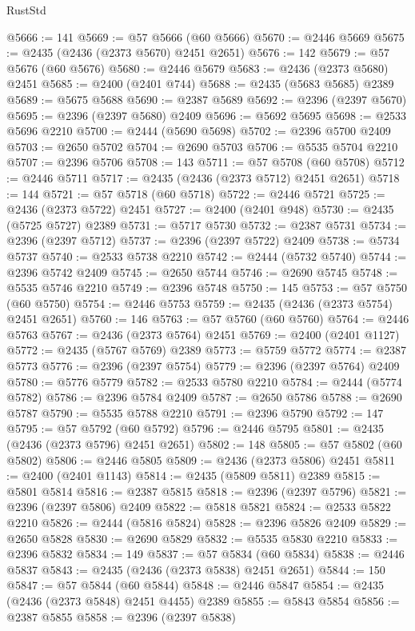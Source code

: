 \begin{lexlean}{RustStd}
\begin{coremodule}
@5666 := 141
@5669 := @57 @5666 (@60 @5666)
@5670 := @2446 @5669
@5675 := @2435 (@2436 (@2373 @5670) @2451 @2651)
@5676 := 142
@5679 := @57 @5676 (@60 @5676)
@5680 := @2446 @5679
@5683 := @2436 (@2373 @5680) @2451
@5685 := @2400 (@2401 @744)
@5688 := @2435 (@5683 @5685) @2389
@5689 := @5675 @5688
@5690 := @2387 @5689
@5692 := @2396 (@2397 @5670)
@5695 := @2396 (@2397 @5680) @2409
@5696 := @5692 @5695
@5698 := @2533 @5696 @2210
@5700 := @2444 (@5690 @5698)
@5702 := @2396 @5700 @2409
@5703 := @2650 @5702
@5704 := @2690 @5703
@5706 := @5535 @5704 @2210
@5707 := @2396 @5706
@5708 := 143
@5711 := @57 @5708 (@60 @5708)
@5712 := @2446 @5711
@5717 := @2435 (@2436 (@2373 @5712) @2451 @2651)
@5718 := 144
@5721 := @57 @5718 (@60 @5718)
@5722 := @2446 @5721
@5725 := @2436 (@2373 @5722) @2451
@5727 := @2400 (@2401 @948)
@5730 := @2435 (@5725 @5727) @2389
@5731 := @5717 @5730
@5732 := @2387 @5731
@5734 := @2396 (@2397 @5712)
@5737 := @2396 (@2397 @5722) @2409
@5738 := @5734 @5737
@5740 := @2533 @5738 @2210
@5742 := @2444 (@5732 @5740)
@5744 := @2396 @5742 @2409
@5745 := @2650 @5744
@5746 := @2690 @5745
@5748 := @5535 @5746 @2210
@5749 := @2396 @5748
@5750 := 145
@5753 := @57 @5750 (@60 @5750)
@5754 := @2446 @5753
@5759 := @2435 (@2436 (@2373 @5754) @2451 @2651)
@5760 := 146
@5763 := @57 @5760 (@60 @5760)
@5764 := @2446 @5763
@5767 := @2436 (@2373 @5764) @2451
@5769 := @2400 (@2401 @1127)
@5772 := @2435 (@5767 @5769) @2389
@5773 := @5759 @5772
@5774 := @2387 @5773
@5776 := @2396 (@2397 @5754)
@5779 := @2396 (@2397 @5764) @2409
@5780 := @5776 @5779
@5782 := @2533 @5780 @2210
@5784 := @2444 (@5774 @5782)
@5786 := @2396 @5784 @2409
@5787 := @2650 @5786
@5788 := @2690 @5787
@5790 := @5535 @5788 @2210
@5791 := @2396 @5790
@5792 := 147
@5795 := @57 @5792 (@60 @5792)
@5796 := @2446 @5795
@5801 := @2435 (@2436 (@2373 @5796) @2451 @2651)
@5802 := 148
@5805 := @57 @5802 (@60 @5802)
@5806 := @2446 @5805
@5809 := @2436 (@2373 @5806) @2451
@5811 := @2400 (@2401 @1143)
@5814 := @2435 (@5809 @5811) @2389
@5815 := @5801 @5814
@5816 := @2387 @5815
@5818 := @2396 (@2397 @5796)
@5821 := @2396 (@2397 @5806) @2409
@5822 := @5818 @5821
@5824 := @2533 @5822 @2210
@5826 := @2444 (@5816 @5824)
@5828 := @2396 @5826 @2409
@5829 := @2650 @5828
@5830 := @2690 @5829
@5832 := @5535 @5830 @2210
@5833 := @2396 @5832
@5834 := 149
@5837 := @57 @5834 (@60 @5834)
@5838 := @2446 @5837
@5843 := @2435 (@2436 (@2373 @5838) @2451 @2651)
@5844 := 150
@5847 := @57 @5844 (@60 @5844)
@5848 := @2446 @5847
@5854 := @2435 (@2436 (@2373 @5848) @2451 @4455) @2389
@5855 := @5843 @5854
@5856 := @2387 @5855
@5858 := @2396 (@2397 @5838)

\end{coremodule}
\end{lexlean}
